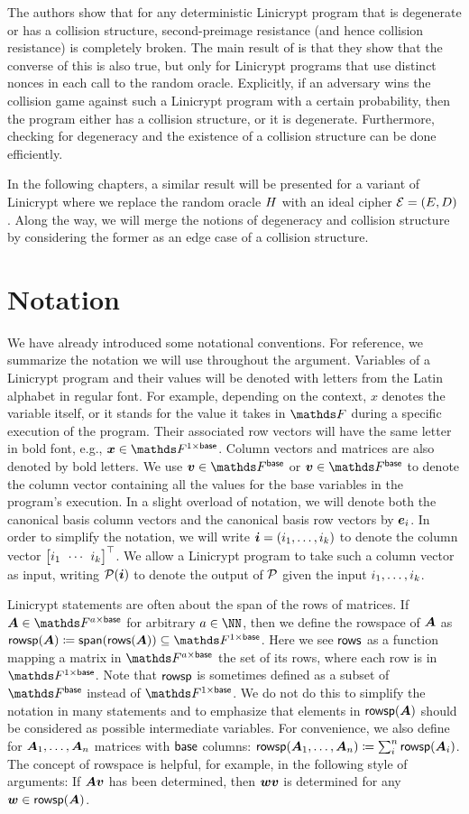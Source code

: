 The authors show that for any deterministic Linicrypt program that is degenerate or has a collision structure,
second-preimage resistance (and hence collision resistance) is completely broken.
The main result of \cite{C:CarRos16} is that they show that the converse of this is also true,
but only for Linicrypt programs that use distinct nonces in each call to the random oracle.
Explicitly, if an adversary wins the collision game against such a Linicrypt program with a certain probability,
then the program either has a collision structure, or it is degenerate.
Furthermore, checking for degeneracy and the existence of a collision structure can be done efficiently.

In the following chapters, a similar result will be presented for a variant of Linicrypt where we replace the random oracle $\H$ with an ideal cipher $\BC=(\E, \D)$.
Along the way,
we will merge the notions of degeneracy and collision structure by considering the former as an edge case of a collision structure.

\section{Notation}
We have already introduced some notational conventions.
For reference, we summarize the notation we will use throughout the argument.
Variables of a Linicrypt program and their values will be denoted with letters from the Latin alphabet in regular font.
For example, depending on the context, $x$ denotes the variable itself,
or it stands for the value it takes in $\F$ during a specific execution of the program.
Their associated row vectors will have the same letter in bold font, e.g., $\vx \in \Frowsp$.
Column vectors and matrices are also denoted by bold letters.
We use $\vbase \in \Fsp$ or $\vv \in \Fsp$ to denote the column vector containing all the values for the base variables in the program's execution.
In a slight overload of notation,
we will denote both the canonical basis column vectors and the canonical basis row vectors by $\ve_i$.
In order to simplify the notation,
we will write $\vi = (i_1, \dots, i_k)$ to denote the column vector $\m{i_1 & \cdots & i_k}^\top$.
We allow a Linicrypt program to take such a column vector as input,
writing $\P(\vi)$ to denote the output of $\P$ given the input $\dts i k$. 

Linicrypt statements are often about the span of the rows of matrices.
If $\v A \in \F^{a\times\base}$ for arbitrary $a \in \NN$,
then we define the rowspace of $\v A$ as $\rowsp(\v A) \coloneqq \spn(\rows(\v A)) \subseteq \Frowsp$.
Here we see $\rows$ as a function mapping a matrix in $\F^{a\times\base}$ the set of its rows, where each row is in $\Frowsp$.
Note that $\rowsp$ is sometimes defined as a subset of $\Fsp$ instead of $\Frowsp$.
We do not do this to simplify the notation in many statements
and to emphasize that elements in $\rowsp(\v A)$ should be considered as possible intermediate variables.
For convenience, we also define for $\dts{\v A}{n}$ matrices with $\base$ columns:
$\rowsp(\dts{\v A}{n}) \coloneqq \sum_i^n \rowsp(\v A_i)$.
The concept of rowspace is helpful, for example, in the following style of arguments:
If $\v A\vv$ has been determined, then $\vw\vv$ is determined for any $\vw \in \rowsp(\v A)$.

